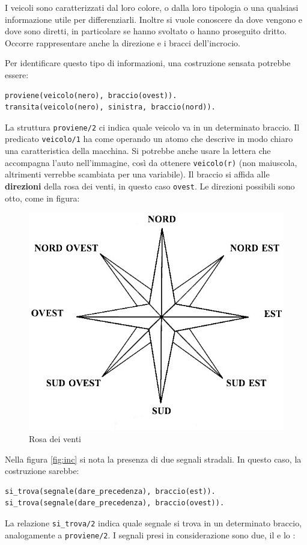 I veicoli sono caratterizzati dal loro colore, o dalla loro tipologia o una qualsiasi informazione utile per differenziarli. Inoltre si vuole conoscere da dove vengono e dove sono diretti, in particolare se hanno svoltato o hanno proseguito dritto. Occorre rappresentare anche la direzione e i bracci dell'incrocio.

Per identificare questo tipo di informazioni, una costruzione sensata potrebbe essere:
\begin{verbatim}
proviene(veicolo(nero), braccio(ovest)).
transita(veicolo(nero), sinistra, braccio(nord)).
\end{verbatim}

La struttura \texttt{proviene/2} ci indica quale veicolo va in un determinato braccio. Il predicato \texttt{veicolo/1} ha come operando un atomo che descrive in modo chiaro una caratteristica della macchina. Si potrebbe anche usare la lettera che accompagna l'auto nell'immagine, così da ottenere \texttt{veicolo(r)} (non maiuscola, altrimenti verrebbe scambiata per una variabile). Il braccio si affida alle \textbf{direzioni} della rosa dei venti, in questo caso \texttt{ovest}. Le direzioni possibili sono otto, come in figura:

\begin{figure}[htb]
	\centering
	\includegraphics[width=.5\textwidth]{images/rose}
	\caption{Rosa dei venti}
\end{figure}

Nella figura \ref{fig:inc} si nota la presenza di due segnali stradali. In questo caso, la costruzione sarebbe:
\begin{verbatim}
si_trova(segnale(dare_precedenza), braccio(est)).
si_trova(segnale(dare_precedenza), braccio(ovest)).
\end{verbatim}

La relazione \texttt{si\_trova/2} indica quale segnale si trova in un determinato braccio, analogamente a \texttt{proviene/2}. I segnali presi in considerazione sono due, il  e lo :

